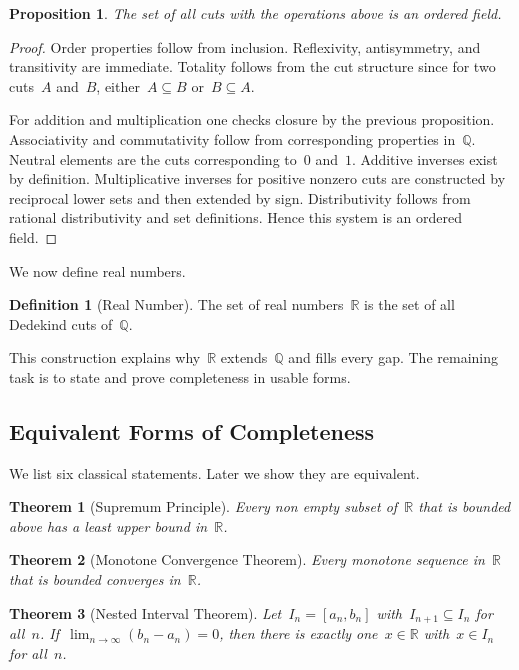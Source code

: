 \documentclass[12pt,a4paper,draft]{article}  %
\newtheorem{theorem}{Theorem}[section]
\newtheorem{proposition}{Proposition}[section]
\theoremstyle{definition}
\newtheorem{definition}{Definition}[section]
\numberwithin{equation}{section}
\newcommand{\RR}{\mathbb{R}}
\begin{document}
\begin{proposition}
The set of all cuts with the operations above is an ordered field.
\end{proposition}

\begin{proof}
Order properties follow from inclusion.
Reflexivity, antisymmetry, and transitivity are immediate.
Totality follows from the cut structure since for two cuts~$A$ and~$B$, either~$A\subseteq B$ or~$B\subseteq A$.

For addition and multiplication one checks closure by the previous proposition.
Associativity and commutativity follow from corresponding properties in~$\mathbb{Q}$.
Neutral elements are the cuts corresponding to~$0$ and~$1$.
Additive inverses exist by definition.
Multiplicative inverses for positive nonzero cuts are constructed by reciprocal lower sets and then extended by sign.
Distributivity follows from rational distributivity and set definitions.
Hence this system is an ordered field.
\end{proof}

We now define real numbers.

\begin{definition}[Real Number]
The set of real numbers~$\RR$ is the set of all Dedekind cuts of~$\mathbb{Q}$.
\end{definition}

This construction explains why~$\RR$ extends~$\mathbb{Q}$ and fills every gap.
The remaining task is to state and prove completeness in usable forms.

\subsection{Equivalent Forms of Completeness}

We list six classical statements.
Later we show they are equivalent.

\begin{theorem}[Supremum Principle]\label{supremum}
Every non empty subset of~$\RR$ that is bounded above has a least upper bound in~$\RR$.
\end{theorem}

\begin{theorem}[Monotone Convergence Theorem]\label{monotone}
Every monotone sequence in~$\RR$ that is bounded converges in~$\RR$.
\end{theorem}

\begin{theorem}[Nested Interval Theorem]\label{nested}
Let~$I_n=[a_n,b_n]$ with~$I_{n+1}\subseteq I_n$ for all~$n$.
If~$\lim_{n\to\infty}(b_n-a_n)=0$, then there is exactly one~$x\in\RR$ with~$x\in I_n$ for all~$n$.
\end{theorem}
\end{document}
